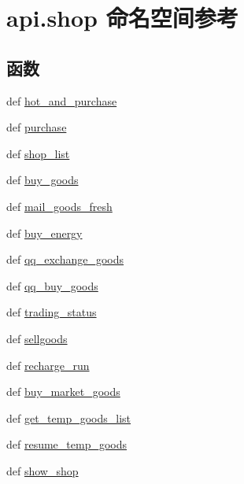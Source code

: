 \hypertarget{namespaceapi_1_1shop}{\section{api.\-shop 命名空间参考}
\label{namespaceapi_1_1shop}
}
\subsection*{函数}
\begin{DoxyCompactItemize}
\item 
def \hyperlink{namespaceapi_1_1shop_a945c160a11cc1bffb60c2b839084dd16}{hot\-\_\-and\-\_\-purchase}
\item 
def \hyperlink{namespaceapi_1_1shop_a880a5b65d543dd974f4da62dc13c8b50}{purchase}
\item 
def \hyperlink{namespaceapi_1_1shop_a4ff9b0450f7f562120bd504ce2ae42a8}{shop\-\_\-list}
\item 
def \hyperlink{namespaceapi_1_1shop_a307a3c7671e91a3d0ea63cace140d688}{buy\-\_\-goods}
\item 
def \hyperlink{namespaceapi_1_1shop_a14f66e6a32f82bee81df2cbfdd4aa8c2}{mail\-\_\-goods\-\_\-fresh}
\item 
def \hyperlink{namespaceapi_1_1shop_a91c4977f50b9b00a0e5aa99aa4d4b812}{buy\-\_\-energy}
\item 
def \hyperlink{namespaceapi_1_1shop_a575addf959933f054d72179c5c6c3b97}{qq\-\_\-exchange\-\_\-goods}
\item 
def \hyperlink{namespaceapi_1_1shop_abb84797ec92cbc10e96b501dccdbfb60}{qq\-\_\-buy\-\_\-goods}
\item 
def \hyperlink{namespaceapi_1_1shop_a6b1408e73c62f4cbf13aae8a835b06b5}{trading\-\_\-status}
\item 
def \hyperlink{namespaceapi_1_1shop_ac3cdd62331703e5b4856e918174fe594}{sellgoods}
\item 
def \hyperlink{namespaceapi_1_1shop_a985dcf94549ba4442278474965f86284}{recharge\-\_\-run}
\item 
def \hyperlink{namespaceapi_1_1shop_a468e56f0f1d8acc95c533dbf1d7f938c}{buy\-\_\-market\-\_\-goods}
\item 
def \hyperlink{namespaceapi_1_1shop_a111fa3216068b80e79d3fbc8784bdeb0}{get\-\_\-temp\-\_\-goods\-\_\-list}
\item 
def \hyperlink{namespaceapi_1_1shop_acf26fdcfee1a44a764fc94de9bfa0ea9}{resume\-\_\-temp\-\_\-goods}
\item 
def \hyperlink{namespaceapi_1_1shop_aedb2f94d633113c9c4e68c07007e0764}{show\-\_\-shop}
\end{DoxyCompactItemize}
